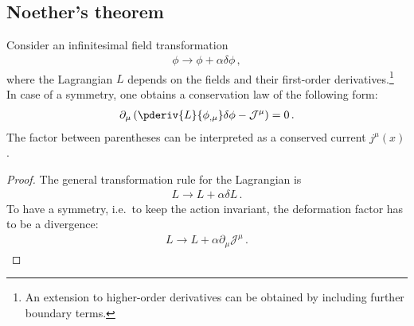 \subsection{Noether's theorem}

    \begin{theorem}\label{field:noethers_theorem}
        Consider an infinitesimal field transformation
        \begin{gather}
            \phi\longrightarrow\phi+\alpha\delta\phi\,,
        \end{gather}
        where the Lagrangian $L$ depends on the fields and their first-order derivatives.\footnote{An extension to higher-order derivatives can be obtained by including further boundary terms.} In case of a symmetry, one obtains a conservation law of the following form:
        \begin{gather}
            \label{field:conserved_current}
            \partial_\mu\left(\pderiv{L}{\phi_{,\mu}}\delta\phi - \mathcal{J}^\mu\right) = 0\,.
        \end{gather}
        The factor between parentheses can be interpreted as a conserved current $j^\mu(x)$.
        \begin{mdframed}[roundcorner=10pt, linecolor=blue, linewidth=1pt]
            \begin{proof}
                The general transformation rule for the Lagrangian is
                \begin{gather}
                    \label{noether_deriv:1}
                    L\longrightarrow L + \alpha\delta L\,.
                \end{gather}
                To have a symmetry, i.e.~to keep the action invariant, the deformation factor has to be a divergence:
                \begin{gather}
                    \label{noether_deriv:2}
                    L\longrightarrow L + \alpha\partial_\mu\mathcal{J}^\mu\,.
                \end{gather}


\end{proof}
\end{mdframed}
\end{theorem}
